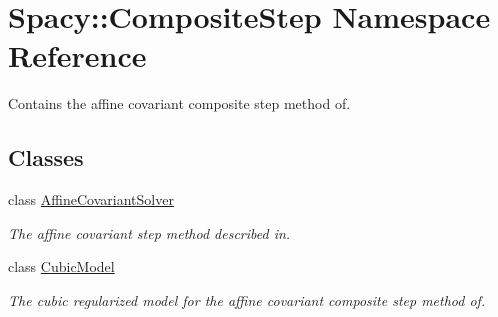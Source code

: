 \hypertarget{namespaceSpacy_1_1CompositeStep}{\section{\-Spacy\-:\-:\-Composite\-Step \-Namespace \-Reference}
\label{namespaceSpacy_1_1CompositeStep}
}


\-Contains the affine covariant composite step method of.  


\subsection*{\-Classes}
\begin{DoxyCompactItemize}
\item 
class \hyperlink{classSpacy_1_1CompositeStep_1_1AffineCovariantSolver}{\-Affine\-Covariant\-Solver}
\begin{DoxyCompactList}\small\item\em \-The affine covariant step method described in. \end{DoxyCompactList}\item 
class \hyperlink{classSpacy_1_1CompositeStep_1_1CubicModel}{\-Cubic\-Model}
\begin{DoxyCompactList}\small\item\em \-The cubic regularized model for the affine covariant composite step method of. \end{DoxyCompactList}\end{DoxyCompactItemize}
